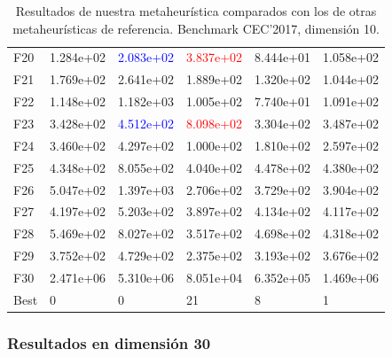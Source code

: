 \documentclass{article}
\begin{document}
\begin{table}[H]
\begin{tabular}{|l|lllll|}
		F20  &  1.284e+02 &  \textcolor{blue}{2.083e+02} &  \textcolor{red}{3.837e+02} &  8.444e+01 &  1.058e+02 \\
		F21  &  1.769e+02 &  2.641e+02 &  1.889e+02 &  1.320e+02 &  1.044e+02 \\
		F22  &  1.148e+02 &  1.182e+03 &  1.005e+02 &  7.740e+01 &  1.091e+02 \\
		F23  &  3.428e+02 &  \textcolor{blue}{4.512e+02} &  \textcolor{red}{8.098e+02} &  3.304e+02 &  3.487e+02 \\
		F24  &  3.460e+02 &  4.297e+02 &  1.000e+02 &  1.810e+02 &  2.597e+02 \\
		F25  &  4.348e+02 &  8.055e+02 &  4.040e+02 &  4.478e+02 &  4.380e+02 \\
		F26  &  5.047e+02 &  1.397e+03 &  2.706e+02 &  3.729e+02 &  3.904e+02 \\
		F27  &  4.197e+02 &  5.203e+02 &  3.897e+02 &  4.134e+02 &  4.117e+02 \\
		F28  &  5.469e+02 &  8.027e+02 &  3.517e+02 &  4.698e+02 &  4.318e+02 \\
		F29  &  3.752e+02 &  4.729e+02 &  2.375e+02 &  3.193e+02 &  3.676e+02 \\
		F30  &  2.471e+06 &  5.310e+06 &  8.051e+04 &  6.352e+05 &  1.469e+06 \\\hline
		Best &          0 &          0 &         21 &          8 &          1 \\
		\hline
	\end{tabular}
	\caption{Resultados de nuestra metaheurística comparados con los de otras metaheurísticas de referencia. Benchmark CEC'2017, dimensión 10.}
	\label{tab:branch-10}
\end{table}

\subsubsection*{Resultados en dimensión 30}
\end{document}
